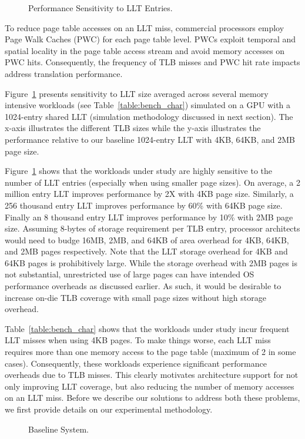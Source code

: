 \begin{figure}[t] 
\vspace{0. in}
\centering
\centerline{}

	\caption{\small Performance Sensitivity to LLT Entries. \normalsize}

\label{fig:tlb_sensitivity} 
\vspace{-0.15 in}
\end{figure}

To reduce page table accesses on an LLT miss, commercial processors
employ Page Walk Caches (PWC) for each page table level. PWCs exploit
temporal and spatial locality in the page table access stream and
avoid memory accesses on PWC hits. Consequently, the frequency of TLB
misses and PWC hit rate impacts address translation performance.

Figure~\ref{fig:tlb_sensitivity} presents sensitivity to LLT size
averaged across several memory intensive workloads (see
Table~\ref{table:bench_char}) simulated on a GPU with a 1024-entry
shared LLT (simulation methodology discussed in next section). The
x-axis illustrates the different TLB sizes while the y-axis
illustrates the performance relative to our baseline 1024-entry LLT
with 4KB, 64KB, and 2MB page size.



Figure~\ref{fig:tlb_sensitivity} shows that the workloads under study
are highly sensitive to the number of LLT entries (especially when
using smaller page sizes). On average, a 2 million entry LLT improves
performance by 2X with 4KB page size. Similarly, a 256 thousand entry
LLT improves performance by 60\% with 64KB page size. Finally an 8
thousand entry LLT improves performance by 10\% with 2MB page size.
Assuming 8-bytes of storage requirement per TLB entry, processor
architects would need to budge 16MB, 2MB, and 64KB of area overhead
for 4KB, 64KB, and 2MB pages respectively. Note that the LLT storage
overhead for 4KB and 64KB pages is prohibitively large. While the
storage overhead with 2MB pages is not substantial, unrestricted use
of large pages can have intended OS performance overheads as discussed
earlier. As such, it would be desirable to increase on-die TLB
coverage with small page sizes without high storage overhead.

Table~\ref{table:bench_char} shows that the workloads under study
incur frequent LLT misses when using 4KB pages. To make things worse,
each LLT miss requires more than one memory access to the page table
(maximum of 2 in some cases). Consequently, these workloads experience
significant performance overheads due to TLB misses. This clearly
motivates architecture support for not only improving LLT coverage,
but also reducing the number of memory accesses on an LLT miss. Before
we describe our solutions to address both these problems, we first
provide details on our experimental methodology.

\begin{figure}[t]
\vspace{0. in}
\centering
\centerline{}

        \caption{\small Baseline System. \normalsize}

\label{fig:config}
\vspace{-0.15 in}
\end{figure}

